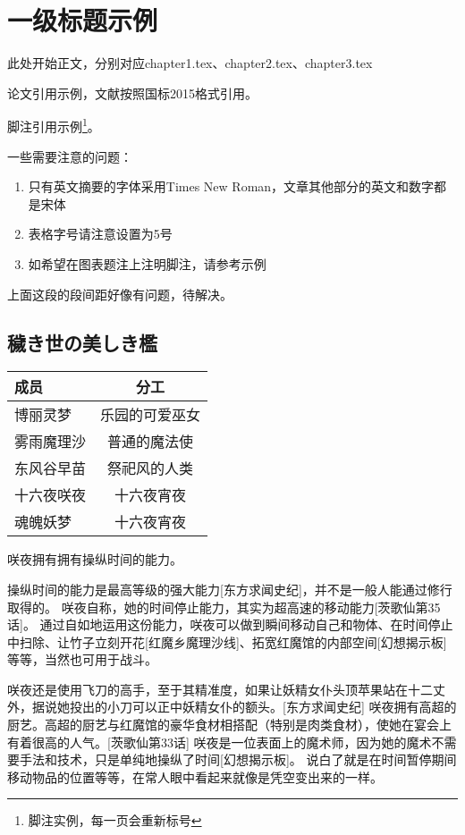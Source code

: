 \chapter{一级标题示例}
此处开始正文，分别对应chapter1.tex、chapter2.tex、chapter3.tex

论文引用示例\cite{王宣承-1}，文献按照国标2015格式引用。

脚注引用示例\footnote{脚注实例，每一页会重新标号}。

一些需要注意的问题：
\begin{enumerate}
    \item 只有英文摘要的字体采用Times New Roman，文章其他部分的英文和数字都是宋体
    \item 表格字号请注意设置为5号
    \item 如希望在图表题注上注明脚注，请参考示例
\end{enumerate}
上面这段的段间距好像有问题，待解决。

\section{穢き世の美しき檻}
\begin{table}[h]
    \centering
    \begin{tabular}{lc}
        \toprule[1.5pt]
        成员       & 分工                                        \\
        \midrule[1.0pt]
        博丽灵梦   & 乐园的可爱巫女            \\
        雾雨魔理沙 & 普通的魔法使 \\
        东风谷早苗 & 祭祀风的人类        \\
        十六夜咲夜 & 十六夜宵夜                      \\
        魂魄妖梦   & 十六夜宵夜            \\
        \bottomrule[1.5pt]
    \end{tabular}
\end{table}
咲夜拥有拥有操纵时间的能力。

操纵时间的能力是最高等级的强大能力[东方求闻史纪]，并不是一般人能通过修行取得的。
咲夜自称，她的时间停止能力，其实为超高速的移动能力[茨歌仙第35话]。
通过自如地运用这份能力，咲夜可以做到瞬间移动自己和物体、在时间停止中扫除、让竹子立刻开花[红魔乡魔理沙线]、拓宽红魔馆的内部空间[幻想揭示板]等等，当然也可用于战斗。

咲夜还是使用飞刀的高手，至于其精准度，如果让妖精女仆头顶苹果站在十二丈外，据说她投出的小刀可以正中妖精女仆的额头。[东方求闻史纪]
咲夜拥有高超的厨艺。高超的厨艺与红魔馆的豪华食材相搭配（特别是肉类食材），使她在宴会上有着很高的人气。[茨歌仙第33话]
咲夜是一位表面上的魔术师，因为她的魔术不需要手法和技术，只是单纯地操纵了时间[幻想揭示板]。 说白了就是在时间暂停期间移动物品的位置等等，在常人眼中看起来就像是凭空变出来的一样。
